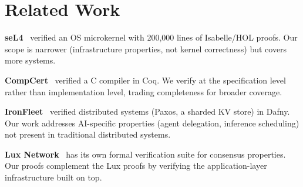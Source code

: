 \section{Related Work}

\label{sec:related}

\textbf{seL4}~\cite{sel4} verified an OS microkernel with 200,000 lines of
Isabelle/HOL proofs. Our scope is narrower (infrastructure properties, not
kernel correctness) but covers more systems.

\textbf{CompCert}~\cite{compcert} verified a C compiler in Coq. We verify at
the specification level rather than implementation level, trading completeness
for broader coverage.

\textbf{IronFleet}~\cite{ironfleet} verified distributed systems (Paxos, a
sharded KV store) in Dafny. Our work addresses AI-specific properties (agent
delegation, inference scheduling) not present in traditional distributed
systems.

\textbf{Lux Network}~\cite{luxwhitepaper} has its own formal verification
suite for consensus properties. Our proofs complement the Lux proofs by
verifying the application-layer infrastructure built on top.


